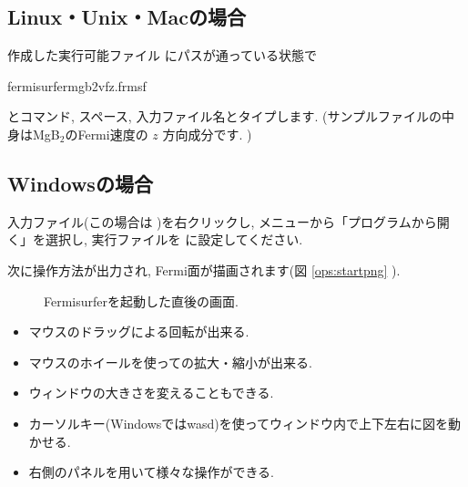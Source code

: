 \documentclass[letterpaper,10pt,dvipdfmx,openany]{sphinxmanual}
\let\sphinxpxdimen\pdfpxdimen\else\newdimen\sphinxpxdimen
\begin{document}
\subsection{Linux・Unix・Macの場合}
\label{\detokenize{ops:linuxunixmac}}
\sphinxAtStartPar
作成した実行可能ファイル  にパスが通っている状態で

\begin{sphinxVerbatim}[commandchars=\\\{\}]
\PYGZdl{}fermisurfermgb2\PYGZus{}vfz.frmsf
\end{sphinxVerbatim}

\sphinxAtStartPar
とコマンド, スペース, 入力ファイル名とタイプします.
(サンプルファイルの中身はMgB$_{\text{2}}$のFermi速度の \(z\) 方向成分です. )


\subsection{Windowsの場合}
\label{\detokenize{ops:windows}}
\sphinxAtStartPar
入力ファイル(この場合は )を右クリックし,
メニューから「プログラムから開く」を選択し,
実行ファイルを  に設定してください.

\sphinxAtStartPar
次に操作方法が出力され, Fermi面が描画されます(図 \ref{ops:startpng} ).

\begin{figure}[htbp]
\centering
\capstart

\noindent\sphinxincludegraphics[width=500\sphinxpxdimen]{{start}.png}
\caption{Fermisurferを起動した直後の画面.}\label{\detokenize{ops:id15}}\label{\detokenize{ops:startpng}}\end{figure}
\begin{itemize}
\item {} 
\sphinxAtStartPar
マウスのドラッグによる回転が出来る.

\item {} 
\sphinxAtStartPar
マウスのホイールを使っての拡大・縮小が出来る.

\item {} 
\sphinxAtStartPar
ウィンドウの大きさを変えることもできる.

\item {} 
\sphinxAtStartPar
カーソルキー(Windowsではwasd)を使ってウィンドウ内で上下左右に図を動かせる.

\item {} 
\sphinxAtStartPar
右側のパネルを用いて様々な操作ができる.

\end{itemize}
\end{document}

